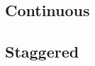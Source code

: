 \documentclass[../../dissertation.tex]{subfiles}
\begin{document}

\subsection{Continuous}
\subsection{Staggered}
\end{document}

